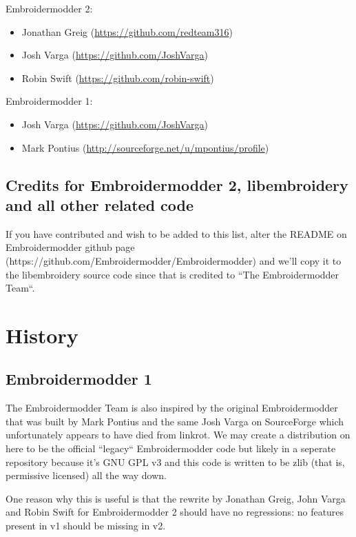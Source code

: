 \documentclass[a4paper]{report}
\begin{document}
Embroidermodder 2:

\begin{itemize}
\item Jonathan Greig (\url{https://github.com/redteam316})
\item Josh Varga (\url{https://github.com/JoshVarga})
\item Robin Swift (\url{https://github.com/robin-swift})
\end{itemize}

Embroidermodder 1:

\begin{itemize}
\item Josh Varga (\url{https://github.com/JoshVarga})
\item Mark Pontius (\url{http://sourceforge.net/u/mpontius/profile})
\end{itemize}

\subsection{Credits for Embroidermodder 2, libembroidery and all other related code}

If you have contributed and wish to be added to this list, alter the  README on Embroidermodder
github page (https://github.com/Embroidermodder/Embroidermodder) and we'll copy it to the
libembroidery source code since that is credited to ``The Embroidermodder Team``.



\section{History}

\subsection{Embroidermodder 1}

The Embroidermodder Team is also inspired by the original Embroidermodder that
was built by Mark Pontius and the same Josh Varga on SourceForge which
unfortunately appears to have died from linkrot. We may create a distribution
on here to be the official ``legacy`` Embroidermodder code but likely in a
seperate repository because it's GNU GPL v3 and this code is written to be
zlib (that is, permissive licensed) all the way down.

One reason why this is useful is that the rewrite by Jonathan Greig, John Varga
and Robin Swift for Embroidermodder 2 should have no regressions: no features
present in v1 should be missing in v2.
\end{document}
